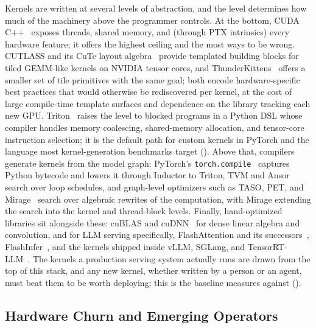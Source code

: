 Kernels are written at several levels of abstraction, and the level determines how much of the machinery above the programmer controls.
At the bottom, CUDA C++~\cite{nvidia2025cudaguide} exposes threads, shared memory, and (through PTX intrinsics) every hardware feature; it offers the highest ceiling and the most ways to be wrong.
CUTLASS and its CuTe layout algebra~\cite{nvidia2023cutlass} provide templated building blocks for tiled GEMM-like kernels on NVIDIA tensor cores, and ThunderKittens~\cite{spector2025thunderkittens} offers a smaller set of tile primitives with the same goal; both encode hardware-specific best practices that would otherwise be rediscovered per kernel, at the cost of large compile-time template surfaces and dependence on the library tracking each new GPU.
Triton~\cite{triton} raises the level to blocked programs in a Python DSL whose compiler handles memory coalescing, shared-memory allocation, and tensor-core instruction selection; it is the default path for custom kernels in PyTorch and the language most kernel-generation benchmarks target ().
Above that, compilers generate kernels from the model graph: PyTorch's \texttt{torch.compile}~\cite{ansel2024pytorch2,paszke2019pytorch} captures Python bytecode and lowers it through Inductor to Triton, TVM and Ansor~\cite{chen2018tvm,zheng2020ansor} search over loop schedules, and graph-level optimizers such as TASO, PET, and Mirage~\cite{jia2019taso,wang2021pet,wu2025mirage} search over algebraic rewrites of the computation, with Mirage extending the search into the kernel and thread-block levels.
Finally, hand-optimized libraries sit alongside these: cuBLAS and cuDNN~\cite{nvidia2025cublas,nvidia2025cudnn} for dense linear algebra and convolution, and for LLM serving specifically, FlashAttention and its successors~\cite{flashattention,dao2024flashattention2,shah2024flashattention3,zadouri2026flashattention4}, FlashInfer~\cite{ye2025flashinfer}, and the kernels shipped inside vLLM, SGLang, and TensorRT-LLM~\cite{vllm,sglang,tensorrt-llm}.
The kernels a production serving system actually runs are drawn from the top of this stack, and any new kernel, whether written by a person or an agent, must beat them to be worth deploying; this is the baseline \FastKernels measures against ().

\subsection{Hardware Churn and Emerging Operators}
\label{background:subsec:churn}

